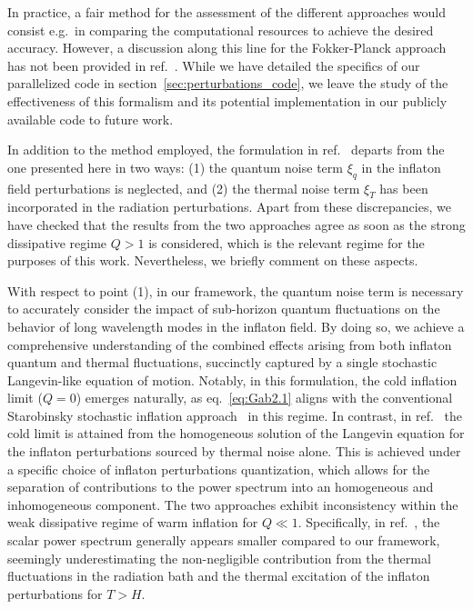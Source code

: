 \documentclass[a4paper,11pt]{article}
\begin{document}
In practice, a fair method for the assessment of the different approaches would consist e.g.\ in comparing the computational resources to achieve the desired accuracy. However, a discussion along this line for the Fokker-Planck approach has not been provided in ref.~\cite{Ballesteros:2023dno}. While we have detailed the specifics of our parallelized code in section~\ref{sec:perturbations_code}, we leave the study of the effectiveness of this formalism and its potential implementation in our publicly available code to future work.

In addition to the method employed, the formulation in ref.~\cite{Ballesteros:2023dno} departs from the one presented here in two ways: (1) the quantum noise term $\xi_q$ in the inflaton field perturbations is neglected, and (2) the thermal noise term $\xi_T$ has been incorporated in the radiation perturbations. Apart from these discrepancies, we have checked that the results from the two approaches agree as soon as the strong dissipative regime $Q > 1$ is considered, which is the relevant regime for the purposes of this work. Nevertheless, we briefly comment on these aspects.

With respect to point (1), in our framework, the quantum noise term  is necessary to accurately consider the impact of sub-horizon quantum fluctuations on the behavior of long wavelength modes in the inflaton field. By doing so, we achieve a comprehensive understanding of the combined effects arising from both inflaton quantum and thermal fluctuations, succinctly captured by a single stochastic Langevin-like equation of motion. Notably, in this formulation, the cold inflation limit ($Q=0$) emerges naturally, as eq.~\eqref{eq:Gab2.1} aligns with the conventional Starobinsky stochastic inflation approach~\cite{Starobinsky:1986fx} in this regime. In contrast, in ref.~\cite{Ballesteros:2023dno} the cold limit is attained from the homogeneous solution of the Langevin equation for the inflaton perturbations sourced by thermal noise alone. This is achieved under a specific choice of inflaton perturbations quantization, which allows for the separation of contributions to the power spectrum into an homogeneous and inhomogeneous component.  The two approaches exhibit inconsistency within the weak dissipative regime of warm inflation for $Q\ll 1$. Specifically, in ref.~\cite{Ballesteros:2023dno}, the scalar power spectrum generally appears smaller compared to our framework, seemingly underestimating the non-negligible contribution from the thermal fluctuations in the radiation bath and the thermal excitation of the inflaton perturbations for $T>H$.
\end{document}
